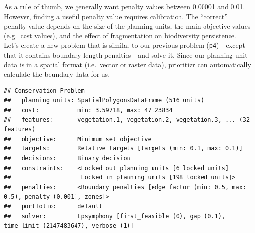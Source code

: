 \documentclass[
  12pt,
]{book}
\newenvironment{Shaded}{\begin{snugshade}}{\end{snugshade}}
\newcommand{\CommentTok}[1]{\textcolor[rgb]{0.56,0.35,0.01}{\textit{#1}}}
\newcommand{\DataTypeTok}[1]{\textcolor[rgb]{0.13,0.29,0.53}{#1}}
\newcommand{\FloatTok}[1]{\textcolor[rgb]{0.00,0.00,0.81}{#1}}
\newcommand{\KeywordTok}[1]{\textcolor[rgb]{0.13,0.29,0.53}{\textbf{#1}}}
\newcommand{\NormalTok}[1]{#1}
\newcommand{\OperatorTok}[1]{\textcolor[rgb]{0.81,0.36,0.00}{\textbf{#1}}}
\newcommand{\StringTok}[1]{\textcolor[rgb]{0.31,0.60,0.02}{#1}}
\begin{document}
As a rule of thumb, we generally want penalty values between 0.00001 and 0.01. However, finding a useful penalty value requires calibration. The ``correct'' penalty value depends on the size of the planning units, the main objective values (e.g.~cost values), and the effect of fragmentation on biodiversity persistence. Let's create a new problem that is similar to our previous problem (\texttt{p4})---except that it contains boundary length penalties---and solve it. Since our planning unit data is in a spatial format (i.e.~vector or raster data), prioritizr can automatically calculate the boundary data for us.

\clearpage

\begin{Shaded}
\end{Shaded}

\begin{verbatim}
## Conservation Problem
##   planning units: SpatialPolygonsDataFrame (516 units)
##   cost:           min: 3.59718, max: 47.23834
##   features:       vegetation.1, vegetation.2, vegetation.3, ... (32 features)
##   objective:      Minimum set objective 
##   targets:        Relative targets [targets (min: 0.1, max: 0.1)]
##   decisions:      Binary decision 
##   constraints:    <Locked out planning units [6 locked units]
##                    Locked in planning units [198 locked units]>
##   penalties:      <Boundary penalties [edge factor (min: 0.5, max: 0.5), penalty (0.001), zones]>
##   portfolio:      default
##   solver:         Lpsymphony [first_feasible (0), gap (0.1), time_limit (2147483647), verbose (1)]
\end{verbatim}
\end{document}
